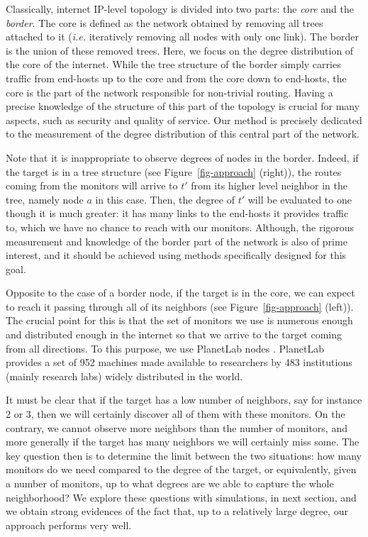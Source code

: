\documentclass[conference]{IEEEtran}
\begin{document}
Classically, internet IP-level topology is divided into two parts: the \emph{core} and the \emph{border}. The core is defined as the network obtained by removing all trees attached to it ({\em i.e.} iteratively removing all nodes with only one link). The border is the union of these removed trees.
Here, we focus on the degree distribution of the core of the internet. While the tree structure of the border simply carries traffic from end-hosts up to the core and from the core down to end-hosts, the core is the part of the network responsible for non-trivial routing. Having a precise knowledge of the structure of this part of the topology is crucial for many aspects, such as security and quality of service. Our method is precisely dedicated to the measurement of the degree distribution of this central part of the network.


Note that it is inappropriate to observe degrees of nodes in the border. Indeed, if the target is in a tree structure (see Figure~\ref{fig-approach} (right)), the routes coming from the monitors will arrive to $t'$ from its higher level neighbor in the tree, namely node $a$ in this case. Then, the degree of $t'$ will be evaluated to one though it is much greater: it has many links to the end-hosts it provides traffic to, which we have no chance to reach with our monitors.
Although, the rigorous measurement and knowledge of the border part of the network is also of prime interest, and it should be achieved using methods specifically designed for this goal. 


 
Opposite to the case of a border node, if the target is in the core, we can expect to reach it passing through all of its neighbors (see Figure~\ref{fig-approach} (left)).
The crucial point for this is that the set of monitors we use is numerous enough and distributed enough in the internet so that we arrive to the target coming from all directions. To this purpose, we use PlanetLab nodes \cite{planetlab}. PlanetLab provides a set of 952 machines made available to researchers by 483 institutions (mainly research labs) widely distributed in the world.

It must be clear that if the target has a low number of neighbors, say for instance $2$ or $3$, then we will certainly discover all of them with these monitors. On the contrary, we cannot observe more neighbors than the number of monitors, and more generally if the target has many neighbors we will certainly miss some. The key question then is to determine the limit between the two situations: how many monitors do we need compared to the degree of the target, or equivalently, given a number of monitors, up to what degrees are we able to capture the whole neighborhood?
We explore these questions with simulations, in next section, and we obtain strong evidences of the fact that, up to a relatively large degree, our approach performs very well.
\end{document}
